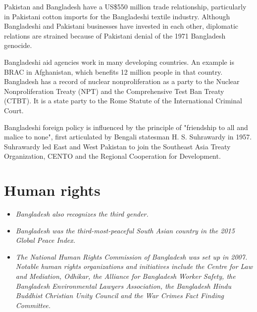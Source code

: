 Pakistan and Bangladesh have a US\$550 million trade relationship,
particularly in Pakistani cotton imports for the Bangladeshi textile
industry. Although Bangladeshi and Pakistani businesses have invested in
each other, diplomatic relations are strained because of Pakistani
denial of the 1971 Bangladesh genocide.

Bangladeshi aid agencies work in many developing countries. An example
is BRAC in Afghanistan, which benefits 12 million people in that
country. Bangladesh has a record of nuclear nonproliferation as a party
to the Nuclear Nonproliferation Treaty (NPT) and the Comprehensive Test
Ban Treaty (CTBT). It is a state party to the Rome Statute of the
International Criminal Court.

Bangladeshi foreign policy is influenced by the principle of "friendship
to all and malice to none", first articulated by Bengali statesman H. S.
Suhrawardy in 1957. Suhrawardy led East and West Pakistan to join the
Southeast Asia Treaty Organization, CENTO and the Regional Cooperation
for Development.

\section{Human rights}\label{human-rights}

\begin{itemize}
\item
  \emph{Bangladesh also recognizes the third gender.}
\item
  \emph{Bangladesh was the third-most-peaceful South Asian country in
  the 2015 Global Peace Index.}
\item
  \emph{The National Human Rights Commission of Bangladesh was set up in
  2007. Notable human rights organizations and initiatives include the
  Centre for Law and Mediation, Odhikar, the Alliance for Bangladesh
  Worker Safety, the Bangladesh Environmental Lawyers Association, the
  Bangladesh Hindu Buddhist Christian Unity Council and the War Crimes
  Fact Finding Committee.}
\end{itemize}

